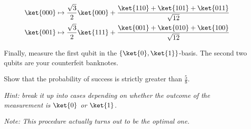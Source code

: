 \documentclass[11pt]{article}
\begin{document}
\begin{align*}
	\ket{000} & \mapsto \frac{\sqrt{3}}{2} \ket{000} + \frac{\ket{110} + \ket{101} + \ket{011}}{\sqrt{12}} \\
	\ket{001} & \mapsto \frac{\sqrt{3}}{2} \ket{111} + \frac{\ket{001} + \ket{010} + \ket{100}}{\sqrt{12}} \\
\end{align*}

Finally, measure the first qubit in the $\{\ket{0},\ket{1}\}$-basis. The second two qubits are your counterfeit banknotes.

Show that the probability of success is strictly greater than $\frac{5}{8}$. 

\textit{Hint: break it up into cases depending on whether the outcome of the measurement is $\ket{0}$ or $\ket{1}$.}

\textit{Note: This procedure actually turns out to be the optimal one.}
\end{document}
